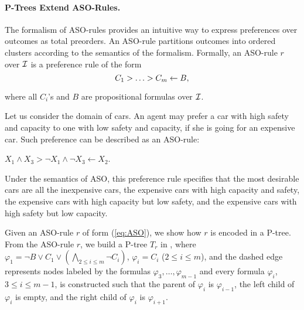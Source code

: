 \paragraph{\bf P-Trees Extend ASO-Rules.} The formalism of ASO-rules 
\cite{Brewka:ASO} provides an intuitive way to express preferences
over outcomes as total preorders.
An ASO-rule partitions outcomes into ordered clusters according to 
the semantics of the formalism.
Formally, an ASO-rule $r$ over $\mathcal{I}$ is a preference rule of the form
\begin{equation} \label{eq:ASO}
\small{C_1 > \ldots > C_m \leftarrow B,}
\end{equation}

\noindent
where all $C_i$'s and $B$ are propositional formulas over $\mathcal{I}$.
%

Let us consider the domain of cars.
An agent may prefer a car with high safety and capacity to
one with low safety and capacity, if she
is going for an expensive car.
Such preference can be described as an ASO-rule:
\begin{center}
	$X_1 \land X_3 > \neg X_1 \land \neg X_3 \leftarrow X_2$.
\end{center}
Under the semantics of ASO, this preference rule specifies that
the most desirable cars are all the inexpensive cars,
the expensive cars with high capacity and safety,
the expensive cars with high capacity but low safety,
and the expensive cars with high safety but low capacity.

Given an ASO-rule $r$ of form (\ref{eq:ASO}),
we show how $r$ is encoded in a P-tree.
From the ASO-rule $r$, we build a P-tree $T_r$ in ,
where $\varphi_1 = \neg B \lor C_1 \lor (\bigwedge_{2 \leq i \leq m} \neg C_i)$,
$\varphi_i =C_i$ ($2 \leq i \leq m$),
and the dashed edge represents nodes labeled by the formulas $\varphi_3,\ldots,\varphi_{m-1}$
and every formula $\varphi_i$, $3 \leq i \leq m-1$, is constructed such that
the parent of $\varphi_i$ is $\varphi_{i-1}$, the left child of $\varphi_i$
is empty, and the right child of $\varphi_i$ is $\varphi_{i+1}$.

